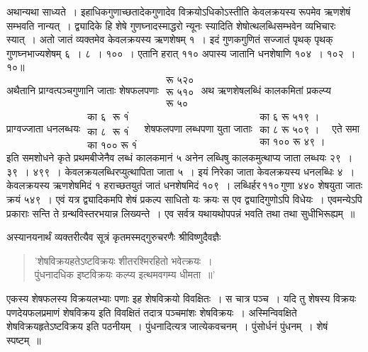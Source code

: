 \documentclass[11pt, openany]{book}
\begin{document}
\vspace{-3mm}
 अथान्यथा साध्यते~। इहाधिकगुणाच्छतादेकगुणादेव विक्रयोऽधिकोऽस्तीति 
केवलक्रयस्य रूपमेव ऋणशेषं सम्भवति नान्यत्~। द्व्यादिके हि शेषे 
गुणघ्नादस्माद्धरो न्यूनः स्यादिति शेषोत्थलब्धिसम्भवेन व्यभिचारः स्यात्~।
अतो जातं व्यक्तमेव केवलक्रयस्य ऋणशेषम् १~। इदं गुणकगुणितं 
सज्जातं पृथक् पृथक् गुणघ्नभाज्यशेषम् ६~। ८~। १००~। एतानि हरात् ११०
अपास्य जातानि धनशेषाणि १०४~। १०२~। १०॥ \\

\vspace{-3mm}
 अथैतानि प्राग्वत्पञ्चगुणानि जाताः शेषफलपणाः 
 $\begin{matrix}
  \mbox{रू ५२०}\\ 
 \mbox{रू ५१०}\\
 \mbox{रू ५० }
 \end{matrix}$
 अथ ऋणशेषलब्धिं कालकमितां प्रकल्प्य प्राग्वज्जाता धनलब्धयः
$\begin{matrix}
\mbox{का ६ ~रू १ं}\\
\mbox{का ८ ~रू १ं}\\
\mbox{का १०० रू १ं}
\end{matrix}$
शेषफलपणा लब्धपणा युता जाताः 
$\begin{matrix}
\mbox{का ६ रू ५१९~।}\\
\mbox{का ८ रू ५०९~।}\\
\mbox{का १०० रू ४९~।}
\end{matrix}$
एते समा इति समशोधने कृते प्रथमबीजेनैव लब्धं कालकमानं ५ अनेन लब्धिषु
कालकमुत्थाप्य जाता लब्धयः २९~। ३९~। ४९९~। केवलक्रयलब्धिरप्युत्थापिता जाता ५~। इयं निरेका जाता केवलक्रयस्य धनलब्धिः 
४~। केवलक्रयस्य ऋणशेषमिदं १ हराच्छतयुतं जातं धनशेषमिदं १०९~। 
लब्धिर्हर\textendash \,११०\textendash \,गुणा ४४० शेषयुता जातः क्रयं ५४९~। एवं यत्र द्व्यादिकमपि शेषं प्रकल्प साधितो यः क्रयः स एव द्व्यादिगुणोऽपि विधेयः~। एवमन्येऽपि प्रकाराः सन्ति ते ग्रन्थविस्तरभयान्न लिख्यन्ते~। एव सर्वत्र यथायथोपपन्नं भवति तथा तथा सुधीभिरूह्यम्~॥
\newpage

 अस्यानयनार्थं व्यक्तरीत्यैव सूत्रं कृतमस्मद्गुरुचरणैः श्रीविष्णुदैवज्ञैः\textendash 
\begin{quote}
    \qt
     'शेषविक्रयहतेऽष्टविक्रयः शीतरश्मिरहितो भवेत्क्रयः~। \\
पुंधनादधिक इष्टविक्रयः कल्प्य इत्थमवगम्य धीमता~॥'
\end{quote}

एकस्य शेषफलस्य विक्रयलभ्याः पणाः इह शेषविक्रयो विवक्षितः~। स चात्र पञ्च~। यदि तु शेषस्य विक्रयः पणदेयफलप्रमाणं शेषविक्रय इति 
विवक्षितं तदात्र पञ्चमांशः शेषविक्रयः~। अस्मिन्विवक्षिते
शेषविक्रयहृतेऽष्टविक्रय इति पठनीयम्~। पुंधनादित्यत्र जात्येकवचनम्~। पुंसोर्धनं पुंधनम्~। शेषं स्पष्टम्~॥ \\
\end{document}
